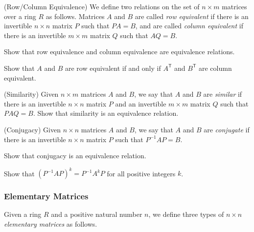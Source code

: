 \begin{exercises}
\ResumeExercises

\item (Row/Column Equivalence) We define two relations on the set of $n \times m$ matrices over a ring $R$ as follows. Matrices $A$ and $B$ are called \emph{row equivalent} if there is an invertible $n \times n$ matrix $P$ such that $PA = B$, and are called \emph{column equivalent} if there is an invertible $m \times m$ matrix $Q$ such that $AQ = B$.
\begin{enumerate*}
\item Show that row equivalence and column equivalence are equivalence relations.
\item Show that $A$ and $B$ are row equivalent if and only if $A^\mathsf{T}$ and $B^\mathsf{T}$ are column equivalent.
\end{enumerate*}

\item (Similarity) Given $n \times m$ matrices $A$ and $B$, we say that $A$ and $B$ are \emph{similar} if there is an invertible $n \times n$ matrix $P$ and an invertible $m \times m$ matrix $Q$ such that $PAQ = B$. Show that similarity is an equivalence relation.

\item (Conjugacy) Given $n \times n$ matrices $A$ and $B$, we say that $A$ and $B$ are \emph{conjugate} if there is an invertible $n \times n$ matrix $P$ such that $P^{-1}AP = B$.
\begin{enumerate*}
\item Show that conjugacy is an equivalence relation.
\item Show that $(P^{-1}AP)^k = P^{-1}A^kP$ for all positive integers $k$.
\end{enumerate*}

\PauseExercises
\end{exercises}

\subsubsection*{Elementary Matrices}

Given a ring $R$ and a positive natural number $n$, we define three types of $n \times n$ \emph{elementary matrices} as follows.

